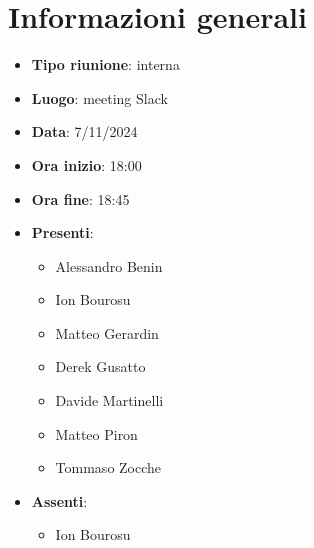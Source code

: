 \section{Informazioni generali}
\begin{itemize}
  \item \textbf{Tipo riunione}: interna
  \item \textbf{Luogo}: meeting Slack
  \item \textbf{Data}: 7/11/2024
  \item \textbf{Ora inizio}: 18:00
  \item \textbf{Ora fine}: 18:45
  
  \item \textbf{Presenti}:
  \begin{itemize}
    \item Alessandro Benin
    \item Ion Bourosu
    \item Matteo Gerardin
    \item Derek Gusatto
    \item Davide Martinelli
    \item Matteo Piron
    \item Tommaso Zocche
  \end{itemize}

  \item \textbf{Assenti}:
    \begin{itemize}
        \item Ion Bourosu
    \end{itemize}
 
\end{itemize}